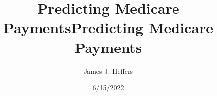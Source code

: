 \documentclass{beamer}
\title[University of Michigan - Ann Arbor]{Predicting Medicare Payments} %
\title[Predicting Medicare Payments]{Predicting Medicare Payments} %
\author{James J. Heffers} %
\institute[U(M)]
{
University of Michigan - Ann Arbor\\ %
\medskip
\textit{heffers@umich.edu} %
}
\date{6/15/2022} %
\begin{document}
\begin{frame}
\titlepage %
\end{frame}





















\end{document}
